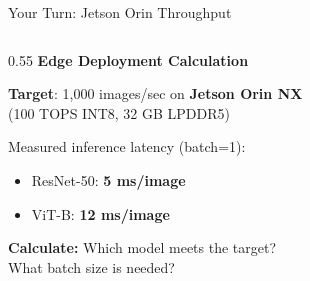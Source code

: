 \documentclass[aspectratio=169, 12pt]{beamer}
\begin{document}
\begin{frame}{Your Turn: Jetson Orin Throughput}

\footnotesize
\begin{columns}[T]
  \begin{column}{0.55\textwidth}
    {\small\bfseries Edge Deployment Calculation}

    \vspace{0.1cm}
    \textbf{Target}: 1,000 images/sec on \textbf{Jetson Orin NX}\\
    (100 TOPS INT8, 32 GB LPDDR5)

    \vspace{0.1cm}
    Measured inference latency (batch=1):
    \begin{itemize}\setlength\itemsep{0pt}
      \item ResNet-50: \textbf{5 ms/image}
      \item ViT-B: \textbf{12 ms/image}
    \end{itemize}

    \vspace{0.1cm}
    \textbf{Calculate:} Which model meets the target?\\
    What batch size is needed?


\end{column}
\end{columns}
\end{frame}
\end{document}
